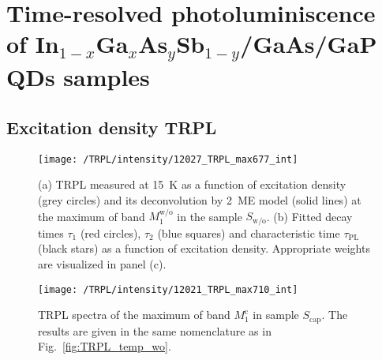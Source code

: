 \chapter{Time-resolved photoluminiscence of In$_{1-x}$Ga$_{x}$As$_y$Sb$_{1-y}$/GaAs/GaP QDs samples}

\section{Excitation density TRPL}
\label{chapter:appendix_TRPL_int}
\begin{figure}
	\centering
	\texttt{[image: /TRPL/intensity/12027\_TRPL\_max677\_int]}
	\caption{(a) TRPL measured at 15~K as a function of excitation density (grey circles) and its deconvolution by 2~ME model (solid lines) at the maximum of band $M_1^\mathrm{w/o}$ in the sample $S_\mathrm{w/o}$. (b) Fitted decay times $\tau_1$ (red circles), $\tau_2$ (blue squares) and characteristic time $\tau_\mathrm{PL}$ (black stars) as a function of excitation density. Appropriate weights are visualized in panel (c).}
\end{figure}


\begin{figure}
	\centering
	\texttt{[image: /TRPL/intensity/12021\_TRPL\_max710\_int]}
	\caption{TRPL spectra of the maximum of band $M_1^\mathrm{c}$ in sample $S_\mathrm{cap}$. The results are given in the same nomenclature as in Fig.~\ref{fig:TRPL_temp_wo}.}
\end{figure}
\newpage 